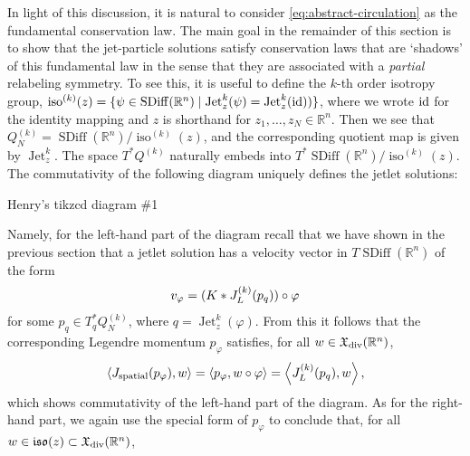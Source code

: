 \documentclass[12pt]{amsart}
\newcommand{\R}{\ensuremath{\mathbb{R}}}
\DeclareMathOperator{\SDiff}{SDiff}
\DeclareMathOperator{\Jet}{Jet}
\DeclareMathOperator{\iso}{iso}
\begin{document}
In light of this discussion, it is natural to consider \eqref{eq:abstract-circulation} as the  fundamental conservation law. The main goal in the remainder of this section is to show that the jet-particle solutions satisfy conservation laws that are `shadows' of this fundamental law in the sense that they are associated with a \emph{partial} relabeling symmetry. To see this, it is useful to define the $k$-th order isotropy group,
$\iso^{(k)}(z) = \{ \psi \in \SDiff(\R^n) \mid \Jet^{k}_z( \psi) = \Jet^k_z (\rm{id})) \}$, where we wrote $\rm{id}$ for the identity mapping and $z$ is shorthand for $z_1, \ldots, z_N \in \mathbb{R}^n$.
Then we see that $Q^{(k)}_N = \SDiff(\R^n) / \iso^{(k)}(z)$, and the corresponding quotient map is given by $\Jet_z^k$.  
 The space $T^*Q^{(k)}$ naturally embeds into $T^*\SDiff(\R^n) / \iso^{(k)}(z)$.  The commutativity of the following diagram uniquely defines the jetlet solutions:
 \begin{framed} Henry's tikzcd diagram \#1
 \end{framed}
  Namely, for the left-hand part of the diagram recall that we have shown in the previous section that a jetlet solution has a velocity vector in $T \SDiff(\R^n)$ of the form \begin{align} v_{\varphi} = (K * J_L^{(k)}(p_q)) \circ \varphi \notag \end{align} for some $p_q \in T^*_q Q^{(k)}_N$, where $q = \Jet^k_z(\varphi)$. From this it follows that the corresponding Legendre momentum $p_\varphi$ satisfies, for all $ w \in \mathfrak{X}_{\rm div}(\R^n)$,
  \begin{align}
  \left< J_\text{spatial}(p_\varphi), w\right> = \left< p_\varphi, w \circ \varphi \right> = \left< J_L^{(k)}(p_q), w \right>, \notag
  \end{align}
  which shows commutativity of the left-hand part of the diagram. As for the right-hand part, we again use the special form of $p_\varphi$ to conclude that, for all $ w \in \mathfrak{iso}(z) \subset \mathfrak{X}_{\rm div}(\R^n)$,
\end{document}
